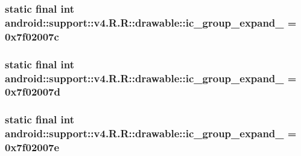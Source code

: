\hypertarget{classandroid_1_1support_1_1v4_1_1_r_1_1drawable_eed30d0124abaf4e539b727c26074162}{
\subsubsection[{ic\_\-group\_\-expand\_\-13}]{\setlength{\rightskip}{0pt plus 5cm}static final int android::support::v4.R.R::drawable::ic\_\-group\_\-expand\_ = 0x7f02007c}}
\label{classandroid_1_1support_1_1v4_1_1_r_1_1drawable_eed30d0124abaf4e539b727c26074162}


\hypertarget{classandroid_1_1support_1_1v4_1_1_r_1_1drawable_8df653432a5063d7d394cbfeb0efaa50}{
\subsubsection[{ic\_\-group\_\-expand\_\-14}]{\setlength{\rightskip}{0pt plus 5cm}static final int android::support::v4.R.R::drawable::ic\_\-group\_\-expand\_ = 0x7f02007d}}
\label{classandroid_1_1support_1_1v4_1_1_r_1_1drawable_8df653432a5063d7d394cbfeb0efaa50}


\hypertarget{classandroid_1_1support_1_1v4_1_1_r_1_1drawable_83fee2dfbb737172df882e5f9e77bb39}{
\subsubsection[{ic\_\-group\_\-expand\_\-15}]{\setlength{\rightskip}{0pt plus 5cm}static final int android::support::v4.R.R::drawable::ic\_\-group\_\-expand\_ = 0x7f02007e}}
\label{classandroid_1_1support_1_1v4_1_1_r_1_1drawable_83fee2dfbb737172df882e5f9e77bb39}


